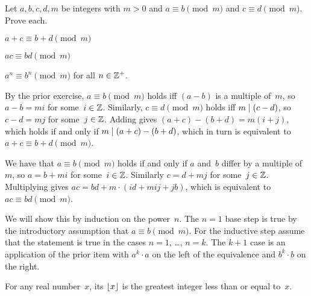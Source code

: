 \documentclass{ibl}  %
\begin{document}
\begin{ex}
Let $a,b,c,d,m$ be integers with $m>0$ and
$a\equiv b\pmod m$ and $c\equiv d\pmod m$.
Prove each.
\begin{exes}
\item $a+c\equiv b+d\pmod m$
\item $ac\equiv bd\pmod m$
\item $a^n\equiv b^n\pmod m$ for all $n\in\mathbb{Z}^+$.
\end{exes}
\begin{ans}
\begin{exes}
\item By the prior exercise, $a\equiv b\pmod m$ holds iff 
  $(a-b)$ is a multiple of~$m$, 
  so $a-b=mi$ for some~$i\in\mathbb{Z}$.
  Similarly, $c\equiv d\pmod m$ holds iff $m\mid (c-d)$, 
  so $c-d=mj$ for some~$j\in\mathbb{Z}$.
  Adding gives $(a+c)-(b+d)=m(i+j)$, which holds if and only if
  $m\mid (a+c)-(b+d)$, which in turn is equivalent to
  $a+c\equiv b+d\pmod m$.
\item We have that $a\equiv b\pmod m$ holds if and only if
  $a$ and~$b$ differ by a multiple of~$m$, so 
  $a=b+mi$ for some~$i\in\mathbb{Z}$. 
  Similarly $c=d+mj$ for some~$j\in\mathbb{Z}$.
  Multiplying gives $ac=bd+m\cdot(id+mij+jb)$, 
  which is equivalent to $ac\equiv bd\pmod m$. 
\item We will show this by induction on the power~$n$.
  The $n=1$ base step is true by the introductory assumption that 
  $a\equiv b\pmod m$.
  For the inductive step assume that the statement is true in the cases
  $n=1$, \ldots, $n=k$.
  The $k+1$ case is an application of the prior item with 
  $a^k\cdot a$ on the left of the equivalence and $b^k\cdot b$ on the
  right.
\end{exes}
\end{ans}
\end{ex}

\begin{df}
For any real number~$x$,
its  $\lfloor x \rfloor$ is
the greatest integer less than or equal to~$x$.  
\end{df}
\end{document}
